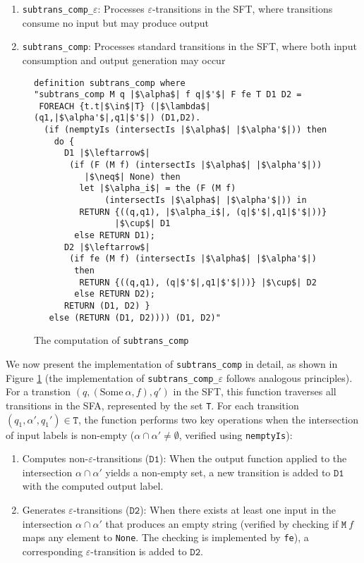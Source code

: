 \documentclass[sigplan,10pt,anonymous,review]{acmart}\settopmatter{printfolios=true,printccs=false,printacmref=false}
\begin{document}
\begin{enumerate}
  \item \texttt{subtrans\_comp\_$\varepsilon$}: Processes $\varepsilon$-transitions in the SFT, where transitions consume no input but may produce output
  \item \texttt{subtrans\_comp}: Processes standard transitions in the SFT, where both input consumption and output generation may occur
\end{enumerate}




\begin{figure}[hbt!]
	\begin{lstlisting}
definition subtrans_comp where
"subtrans_comp M q |$\alpha$| f q|$'$| F fe T D1 D2 =
 FOREACH {t.t|$\in$|T} (|$\lambda$| (q1,|$\alpha'$|,q1|$'$|) (D1,D2).
  (if (nemptyIs (intersectIs |$\alpha$| |$\alpha'$|)) then
    do {
      D1 |$\leftarrow$| 
       (if (F (M f) (intersectIs |$\alpha$| |$\alpha'$|)) 
          |$\neq$| None) then
         let |$\alpha_i$| = the (F (M f) 
              (intersectIs |$\alpha$| |$\alpha'$|)) in
         RETURN {((q,q1), |$\alpha_i$|, (q|$'$|,q1|$'$|))} 
                |$\cup$| D1
        else RETURN D1);
      D2 |$\leftarrow$| 
       (if fe (M f) (intersectIs |$\alpha$| |$\alpha'$|) 
        then 
         RETURN {((q,q1), (q|$'$|,q1|$'$|))} |$\cup$| D2 
        else RETURN D2);
      RETURN (D1, D2) }
   else (RETURN (D1, D2)))) (D1, D2)"
    \end{lstlisting}
    \caption{The computation of \texttt{subtrans\_comp}}
    \label{fig-def-subtrans_comp}
    \end{figure}


    We now present the implementation of \texttt{subtrans\_comp} in detail, as shown in Figure \ref{fig-def-subtrans_comp} (the implementation of \texttt{subtrans\_comp\_$\varepsilon$} follows analogous principles). For a transtion $(q, (\text{Some}~\alpha, f), q')$ in the SFT, this function traverses all transitions in the SFA, represented by the set \texttt{T}. For each transition $(q_1, \alpha', q_1')\in \texttt{T}$, the function performs two key operations when the intersection of input labels is non-empty ($\alpha \cap \alpha' \neq \emptyset$, verified using \texttt{nemptyIs}):

    \begin{enumerate}
      \item Computes non-$\varepsilon$-transitions ($\texttt{D1}$): When the output function applied to the intersection $\alpha \cap \alpha'$ yields a non-empty set, a new transition is added to $\texttt{D1}$ with the computed output label.
      \item Generates $\varepsilon$-transitions ($\texttt{D2}$): When there exists at least one input in the intersection $\alpha \cap \alpha'$ that produces an empty string (verified by checking if $\texttt{M}~f$ maps any element to \texttt{None}. The checking is implemented by \texttt{fe}), a corresponding $\varepsilon$-transition is added to $\texttt{D2}$.
    \end{enumerate}
    
\end{document}
